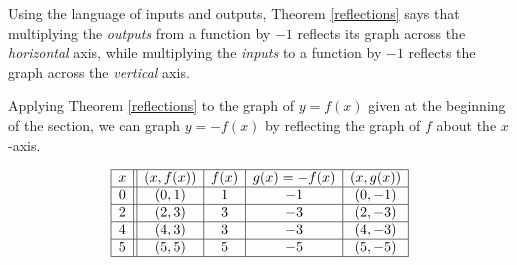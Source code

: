 \documentclass{ximera}
\begin{document}
\smallskip

Using the  language of inputs and outputs, Theorem \ref{reflections} says that multiplying the \textit{outputs} from a function by $-1$ reflects its graph across the \textit{horizontal} axis, while multiplying the \textit{inputs} to a function by $-1$ reflects the graph across the \textit{vertical} axis.

\smallskip

Applying Theorem \ref{reflections} to the graph of $y=f(x)$ given at the beginning of the section, we can graph $y=-f(x)$ by reflecting the graph of $f$ about the $x$-axis.

\[ \begin{array}{|c||c|c|c|c|}  

\hline

 x & (x,f(x)) & f(x) & g(x)=-f(x) & (x, g(x)) \\ \hline
0  & (0,1)& 1 & -1 &(0, -1) \\  \hline
2 & (2,3) & 3 &  -3 &(2,-3) \\  \hline
4 & (4,3) & 3 &  -3&(4, -3) \\  \hline
5 & (5,5) & 5 &  -5 &( 5 ,-5) \\  \hline

\end{array} \] 
\end{document}
